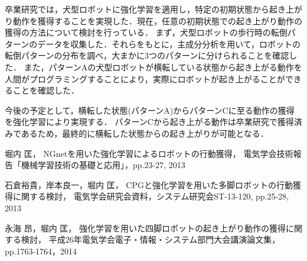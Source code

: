 \documentclass{jarticle}
\begin{document}
卒業研究では，犬型ロボットに強化学習を適用し，特定の初期状態から起き上がり動作を獲得することを実現した．現在，任意の初期状態での起き上がり動作の獲得の方法について検討を行っている．
まず，犬型ロボットの歩行時の転倒パターンのデータを収集した．それらをもとに，主成分分析を用いて，ロボットの転倒パターンの分布を調べ，大まかに3つのパターンに分けられることを確認した．
また，パターンAの犬型ロボットが横転している状態から起き上がる動作を人間がプログラミングすることにより，実際にロボットが起き上がることができることを確認した．

今後の予定として，横転した状態(パターンA)からパターンCに至る動作の獲得を強化学習により実現する．
パターンCから起き上がる動作は卒業研究で獲得済みであるため，最終的に横転した状態からの起き上がりが可能となる．

\begin{thebibliography}{99}

堀内 匡，
NGnetを用いた強化学習によるロボットの行動獲得，
電気学会技術報告「機械学習技術の基礎と応用」，pp.23-27, 2013

石倉裕貴，岸本良一，堀内 匡，
CPGと強化学習を用いた多脚ロボットの行動獲得に関する検討，
電気学会研究会資料，システム研究会ST-13-120, pp.25-28, 2013

永海 昂，堀内 匡，
強化学習を用いた四脚ロボットの起き上がり動作の獲得に関する検討，
平成26年電気学会電子・情報・システム部門大会講演論文集，pp.1763-1764，2014

\end{thebibliography}
\end{document}
